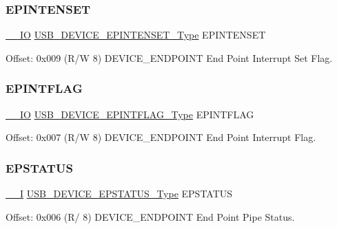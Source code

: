 \subsubsection{\texorpdfstring{EPINTENSET}{EPINTENSET}}
{\footnotesize\ttfamily \mbox{\hyperlink{core__cm0plus_8h_aec43007d9998a0a0e01faede4133d6be}{\+\_\+\+\_\+\+IO}} \mbox{\hyperlink{union_u_s_b___d_e_v_i_c_e___e_p_i_n_t_e_n_s_e_t___type}{U\+S\+B\+\_\+\+D\+E\+V\+I\+C\+E\+\_\+\+E\+P\+I\+N\+T\+E\+N\+S\+E\+T\+\_\+\+Type}} E\+P\+I\+N\+T\+E\+N\+S\+ET}



Offset\+: 0x009 (R/W 8) D\+E\+V\+I\+C\+E\+\_\+\+E\+N\+D\+P\+O\+I\+NT End Point Interrupt Set Flag. 

\mbox{\label{struct_usb_device_endpoint_a23320ab7e1bdcf41514217fb2ad9d035}} 
\subsubsection{\texorpdfstring{EPINTFLAG}{EPINTFLAG}}
{\footnotesize\ttfamily \mbox{\hyperlink{core__cm0plus_8h_aec43007d9998a0a0e01faede4133d6be}{\+\_\+\+\_\+\+IO}} \mbox{\hyperlink{union_u_s_b___d_e_v_i_c_e___e_p_i_n_t_f_l_a_g___type}{U\+S\+B\+\_\+\+D\+E\+V\+I\+C\+E\+\_\+\+E\+P\+I\+N\+T\+F\+L\+A\+G\+\_\+\+Type}} E\+P\+I\+N\+T\+F\+L\+AG}



Offset\+: 0x007 (R/W 8) D\+E\+V\+I\+C\+E\+\_\+\+E\+N\+D\+P\+O\+I\+NT End Point Interrupt Flag. 

\mbox{\label{struct_usb_device_endpoint_ad4a7b57b4deae20f2d888ad33316a664}} 
\subsubsection{\texorpdfstring{EPSTATUS}{EPSTATUS}}
{\footnotesize\ttfamily \mbox{\hyperlink{core__cm0plus_8h_af63697ed9952cc71e1225efe205f6cd3}{\+\_\+\+\_\+I}} \mbox{\hyperlink{union_u_s_b___d_e_v_i_c_e___e_p_s_t_a_t_u_s___type}{U\+S\+B\+\_\+\+D\+E\+V\+I\+C\+E\+\_\+\+E\+P\+S\+T\+A\+T\+U\+S\+\_\+\+Type}} E\+P\+S\+T\+A\+T\+US}



Offset\+: 0x006 (R/ 8) D\+E\+V\+I\+C\+E\+\_\+\+E\+N\+D\+P\+O\+I\+NT End Point Pipe Status. 

